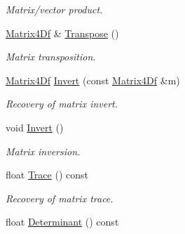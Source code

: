 \begin{DoxyCompactItemize}
\begin{DoxyCompactList}\small\item\em \-Matrix/vector product. \end{DoxyCompactList}\item 
\hypertarget{class_matrix4_df_abe972ba129800a38927c1a1c6dfb8b54}{
\hyperlink{class_matrix4_df}{\-Matrix4\-Df} \& \hyperlink{class_matrix4_df_abe972ba129800a38927c1a1c6dfb8b54}{\-Transpose} ()}
\label{class_matrix4_df_abe972ba129800a38927c1a1c6dfb8b54}

\begin{DoxyCompactList}\small\item\em \-Matrix transposition. \end{DoxyCompactList}\item 
\hypertarget{class_matrix4_df_ac760c789d0dc8b540b8b3784d4b2eeeb}{
\hyperlink{class_matrix4_df}{\-Matrix4\-Df} \hyperlink{class_matrix4_df_ac760c789d0dc8b540b8b3784d4b2eeeb}{\-Invert} (const \hyperlink{class_matrix4_df}{\-Matrix4\-Df} \&m)}
\label{class_matrix4_df_ac760c789d0dc8b540b8b3784d4b2eeeb}

\begin{DoxyCompactList}\small\item\em \-Recovery of matrix invert. \end{DoxyCompactList}\item 
\hypertarget{class_matrix4_df_a4e569837b04785ee487ed6ad6aad5bd7}{
void \hyperlink{class_matrix4_df_a4e569837b04785ee487ed6ad6aad5bd7}{\-Invert} ()}
\label{class_matrix4_df_a4e569837b04785ee487ed6ad6aad5bd7}

\begin{DoxyCompactList}\small\item\em \-Matrix inversion. \end{DoxyCompactList}\item 
\hypertarget{class_matrix4_df_af5a26bc64adf73064f59a36ccb4ffb1c}{
float \hyperlink{class_matrix4_df_af5a26bc64adf73064f59a36ccb4ffb1c}{\-Trace} () const }
\label{class_matrix4_df_af5a26bc64adf73064f59a36ccb4ffb1c}

\begin{DoxyCompactList}\small\item\em \-Recovery of matrix trace. \end{DoxyCompactList}\item 
\hypertarget{class_matrix4_df_a80fcdeff5b17e0af14720a3363e3ec08}{
float \hyperlink{class_matrix4_df_a80fcdeff5b17e0af14720a3363e3ec08}{\-Determinant} () const }
\label{class_matrix4_df_a80fcdeff5b17e0af14720a3363e3ec08}


\end{DoxyCompactItemize}
